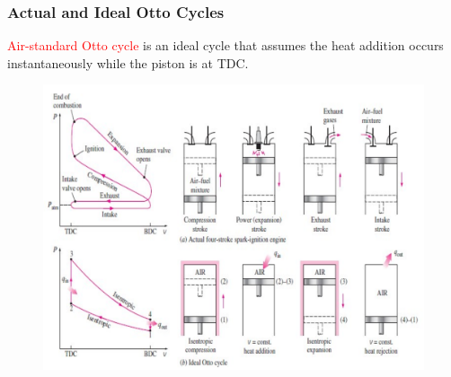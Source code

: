 \documentclass[10pt,compress]{beamer}
\newcommand{\red}{\textcolor{red}}
\begin{document}
\begin{frame}
 \frametitle{Actual and Ideal Otto Cycles}\scriptsize
    \red{Air-standard Otto cycle} is an ideal cycle that assumes the heat addition occurs instantaneously while the piston is at TDC.
    \begin{figure}%
     \begin{center}
      \includegraphics[width=9.cm,clip]{./Pics/InternalCombustion_IdealOttoCycle}
     \end{center}
    \end{figure} 
\end{frame}
\end{document}
